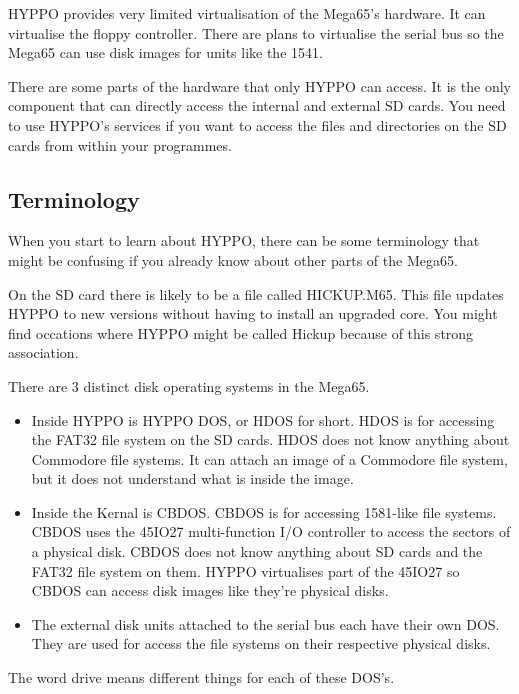 HYPPO provides very limited virtualisation of the Mega65's hardware. It can
virtualise the floppy controller. There are plans to virtualise the serial bus
so the Mega65 can use disk images for units like the 1541.

There are some parts of the hardware that only HYPPO can access. It is the only
component that can directly access the internal and external SD cards. You need
to use HYPPO's services if you want to access the files and directories on the
SD cards from within your programmes.

\subsection{Terminology}

When you start to learn about HYPPO, there can be some terminology that might be
confusing if you already know about other parts of the Mega65.

On the SD card there is likely to be a file called HICKUP.M65. This file updates
HYPPO to new versions without having to install an upgraded core. You might find
occations where HYPPO might be called Hickup because of this strong association.

There are 3 distinct disk operating systems in the Mega65.

\begin{itemize}
  \item Inside HYPPO is HYPPO DOS, or HDOS for short. HDOS is for accessing
        the FAT32 file system on the SD cards. HDOS does not know anything
        about Commodore file systems. It can attach an image of a Commodore
        file system, but it does not understand what is inside the image.
  \item Inside the Kernal is CBDOS. CBDOS is for accessing 1581-like file
        systems. CBDOS uses the 45IO27 multi-function I/O controller to access
        the sectors of a physical disk. CBDOS does not know anything about SD
        cards and the FAT32 file system on them. HYPPO virtualises part of the
        45IO27 so CBDOS can access disk images like they're physical disks.
  \item The external disk units attached to the serial bus each have their own
        DOS. They are used for access the file systems on their respective
        physical disks.
\end{itemize}

The word drive means different things for each of these DOS's.

